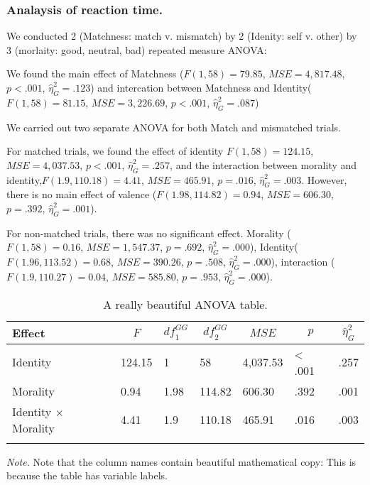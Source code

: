 \documentclass[man]{apa6}
\begin{document}
\hypertarget{analaysis-of-reaction-time.-3}{%
\subsubsection{Analaysis of reaction time.}\label{analaysis-of-reaction-time.-3}}

We conducted 2 (Matchness: match v. mismatch) by 2 (Idenity: self v. other) by 3 (morlaity: good, neutral, bad) repeated measure ANOVA:

We found the main effect of Matchness (\(F(1, 58) = 79.85\), \(\mathit{MSE} = 4,817.48\), \(p < .001\), \(\hat{\eta}^2_G = .123\)) and intercation between Matchness and Identity(\(F(1, 58) = 81.15\), \(\mathit{MSE} = 3,226.69\), \(p < .001\), \(\hat{\eta}^2_G = .087\))

We carried out two separate ANOVA for both Match and mismatched trials.

For matched trials, we found the effect of identity \(F(1, 58) = 124.15\), \(\mathit{MSE} = 4,037.53\), \(p < .001\), \(\hat{\eta}^2_G = .257\), and the interaction between morality and identity,\(F(1.9, 110.18) = 4.41\), \(\mathit{MSE} = 465.91\), \(p = .016\), \(\hat{\eta}^2_G = .003\). However, there is no main effect of valence (\(F(1.98, 114.82) = 0.94\), \(\mathit{MSE} = 606.30\), \(p = .392\), \(\hat{\eta}^2_G = .001\)).

For non-matched trials, there was no significant effect. Morality (\(F(1, 58) = 0.16\), \(\mathit{MSE} = 1,547.37\), \(p = .692\), \(\hat{\eta}^2_G = .000\)), Identity(\(F(1.96, 113.52) = 0.68\), \(\mathit{MSE} = 390.26\), \(p = .508\), \(\hat{\eta}^2_G = .000\)), interaction (\(F(1.9, 110.27) = 0.04\), \(\mathit{MSE} = 585.80\), \(p = .953\), \(\hat{\eta}^2_G = .000\)).

\begin{table}[tbp]
\begin{center}
\begin{threeparttable}
\caption{\label{tab:unnamed-chunk-6}A really beautiful ANOVA table.}
\begin{tabular}{lllllll}
\toprule
Effect & \multicolumn{1}{c}{$F$} & \multicolumn{1}{c}{$\mathit{df}_1^{GG}$} & \multicolumn{1}{c}{$\mathit{df}_2^{GG}$} & \multicolumn{1}{c}{$\mathit{MSE}$} & \multicolumn{1}{c}{$p$} & \multicolumn{1}{c}{$\hat{\eta}^2_G$}\\
\midrule
Identity & 124.15 & 1 & 58 & 4,037.53 & < .001 & .257\\
Morality & 0.94 & 1.98 & 114.82 & 606.30 & .392 & .001\\
Identity $\times$ Morality & 4.41 & 1.9 & 110.18 & 465.91 & .016 & .003\\
\bottomrule
\addlinespace
\end{tabular}
\begin{tablenotes}[para]
\normalsize{\textit{Note.} Note that the column names contain beautiful mathematical copy: This is because the table has variable labels.}
\end{tablenotes}
\end{threeparttable}
\end{center}
\end{table}
\end{document}
